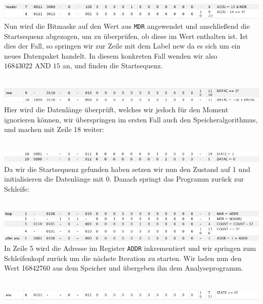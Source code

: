 \documentclass[12pt,titlepage]{article}
\begin{document}
\leavevmode \\
\includegraphics[width=16cm]{listing/row7-8.png}
\leavevmode \\

Nun wird die Bitmaske auf den Wert aus \texttt{MDR} angewendet und anschließend die Startsequenz abgezogen, um
zu überprüfen, ob diese im Wert enthalten ist. Ist dies der Fall, so springen wir zur Zeile mit dem Label \dq new\dq
da es sich um ein neues Datenpaket handelt. In diesem konkreten Fall wenden wir also $16843022 \text{ AND } 15$ an, und finden
die Startsequenz.

\leavevmode \\
\includegraphics[width=16cm]{listing/row9-10.png}
\leavevmode \\

Hier wird die Datenlänge überprüft, welches wir jedoch für den Moment ignorieren können, wir überspringen im ersten Fall auch den Speicheralgorithmus, 
und machen mit Zeile 18 weiter:

\leavevmode \\
\includegraphics[width=16cm]{listing/row18-19.png}
\leavevmode \\

Da wir die Startsequenz gefunden haben setzen wir nun den Zustand auf 1 und initialisieren die Datenlänge mit 0. Danach springt
das Programm zurück zur Schleife:

\leavevmode \\
\includegraphics[width=16cm]{listing/row1-5.png}
\leavevmode \\

In Zeile 5 wird die Adresse im Register \texttt{ADDR} inkrementiert und wir springen zum Schleifenkopf zurück um die nächste
Iteration zu starten. Wir laden nun den Wert 16842760 aus dem Speicher und übergeben ihn dem Analyseprogramm.

\leavevmode \\
\includegraphics[width=16cm]{listing/row6.png}
\leavevmode \\
\end{document}
